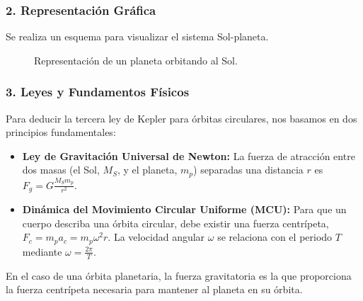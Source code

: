 \subsubsection*{2. Representación Gráfica}
Se realiza un esquema para visualizar el sistema Sol-planeta.
\begin{figure}[H]
    \centering
    \caption{Representación de un planeta orbitando al Sol.}
\end{figure}

\subsubsection*{3. Leyes y Fundamentos Físicos}
Para deducir la tercera ley de Kepler para órbitas circulares, nos basamos en dos principios fundamentales:
\begin{itemize}
    \item \textbf{Ley de Gravitación Universal de Newton:} La fuerza de atracción entre dos masas (el Sol, $M_S$, y el planeta, $m_p$) separadas una distancia $r$ es $F_g = G \frac{M_S m_p}{r^2}$.
    \item \textbf{Dinámica del Movimiento Circular Uniforme (MCU):} Para que un cuerpo describa una órbita circular, debe existir una fuerza centrípeta, $F_c = m_p a_c = m_p \omega^2 r$. La velocidad angular $\omega$ se relaciona con el periodo $T$ mediante $\omega = \frac{2\pi}{T}$.
\end{itemize}
En el caso de una órbita planetaria, la fuerza gravitatoria es la que proporciona la fuerza centrípeta necesaria para mantener al planeta en su órbita.

